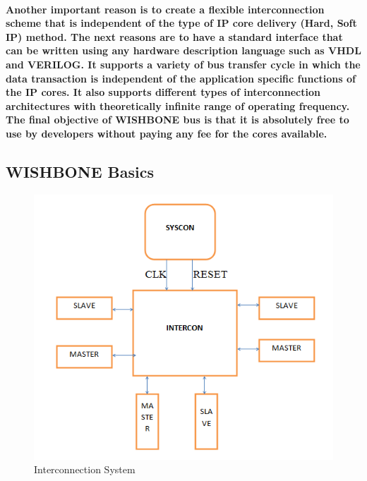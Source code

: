 \documentclass[12pt,a4paper]{report}
\begin{document}
\paragraph{\textrm{\textmd{Another important reason is to create a flexible interconnection scheme
			that is independent of the type of IP core delivery (Hard, Soft IP) method. The next
			reasons are to have a standard interface that can be written using any hardware
			description language such as VHDL and VERILOG. It supports a variety of bus
			transfer cycle in which the data transaction is independent of the application specific
			functions of the IP cores. It also supports different types of interconnection architectures
			with theoretically infinite range of operating frequency. The final objective of
			WISHBONE bus is that it is absolutely free to use by developers without paying any fee
			for the cores available.}}}
\subsection{WISHBONE Basics }
\begin{figure}[h]
	\centering
	\includegraphics[scale=.6]{wb.png}
	\caption{Interconnection System}
	\label{fig:ifstage}
\end{figure}
\end{document}
